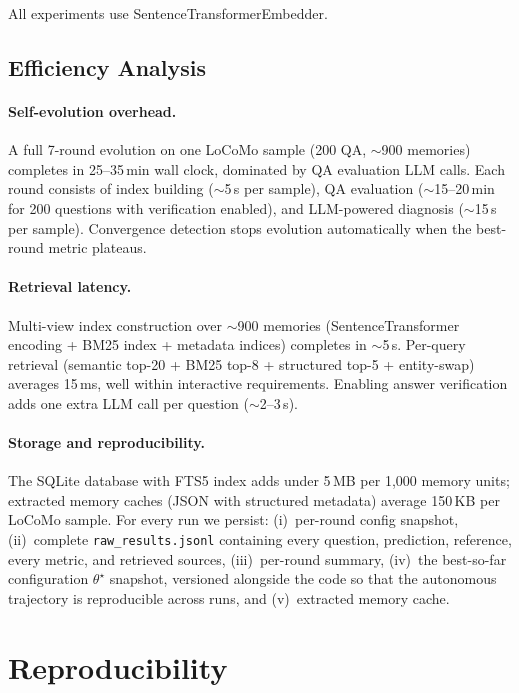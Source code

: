 All experiments use SentenceTransformerEmbedder.

\subsection{Efficiency Analysis}
\label{app:efficiency}

\paragraph{Self-evolution overhead.} A full 7-round evolution on one LoCoMo sample (200 QA, $\sim$900 memories) completes in 25--35\,min wall clock, dominated by QA evaluation LLM calls. Each round consists of index building ($\sim$5\,s per sample), QA evaluation ($\sim$15--20\,min for 200 questions with verification enabled), and LLM-powered diagnosis ($\sim$15\,s per sample). Convergence detection stops evolution automatically when the best-round metric plateaus.

\paragraph{Retrieval latency.} Multi-view index construction over $\sim$900 memories (SentenceTransformer encoding + BM25 index + metadata indices) completes in $\sim$5\,s. Per-query retrieval (semantic top-20 + BM25 top-8 + structured top-5 + entity-swap) averages 15\,ms, well within interactive requirements. Enabling answer verification adds one extra LLM call per question ($\sim$2--3\,s).

\paragraph{Storage and reproducibility.} The SQLite database with FTS5 index adds under 5\,MB per 1{,}000 memory units; extracted memory caches (JSON with structured metadata) average 150\,KB per LoCoMo sample. For every run we persist: (i)~per-round config snapshot, (ii)~complete \texttt{raw\_results.jsonl} containing every question, prediction, reference, every metric, and retrieved sources, (iii)~per-round summary, (iv)~the best-so-far configuration $\theta^\star$ snapshot, versioned alongside the code so that the autonomous trajectory is reproducible across runs, and (v)~extracted memory cache.

\section{Reproducibility}
\label{app:reproducibility}

